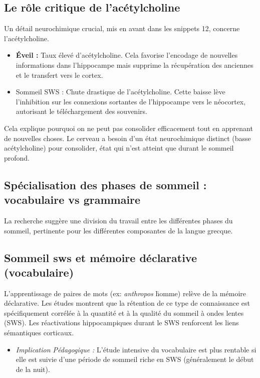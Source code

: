 \subsection{Le rôle critique de l'acétylcholine}

Un détail neurochimique crucial, mis en avant dans les snippets 12, concerne l'acétylcholine.

\begin{itemize}\item \textbf{Éveil :} Taux élevé d'acétylcholine. Cela favorise l'encodage de nouvelles informations dans l'hippocampe mais supprime la récupération des anciennes et le transfert vers le cortex.\item Sommeil SWS : Chute drastique de l'acétylcholine. Cette baisse lève l'inhibition sur les connexions sortantes de l'hippocampe vers le néocortex, autorisant le \og téléchargement\fg{} des souvenirs.\end{itemize}Cela explique pourquoi on ne peut pas consolider efficacement tout en apprenant de nouvelles choses.
Le cerveau a besoin d'un état neurochimique distinct (basse acétylcholine) pour consolider, état qui
n'est atteint que durant le sommeil profond.



\subsection{Spécialisation des phases de sommeil : vocabulaire vs grammaire}

La recherche suggère une division du travail entre les différentes phases du sommeil, pertinente
pour les différentes composantes de la langue grecque.



\subsection{Sommeil sws et mémoire déclarative (vocabulaire)}

L'apprentissage de paires de mots (ex: \textit{anthropos} \= homme) relève de la mémoire
déclarative. Les études montrent que la rétention de ce type de connaissance est spécifiquement
corrélée à la quantité et à la qualité du sommeil à ondes lentes (SWS).\cite{III-3-1-ref15} Les
réactivations hippocampiques durant le SWS renforcent les liens sémantiques corticaux.

\begin{itemize}\item \textit{Implication Pédagogique :} L'étude intensive du vocabulaire est plus rentable si elle est suivie d'une période de sommeil riche en SWS (généralement le début de la nuit).\end{itemize}

